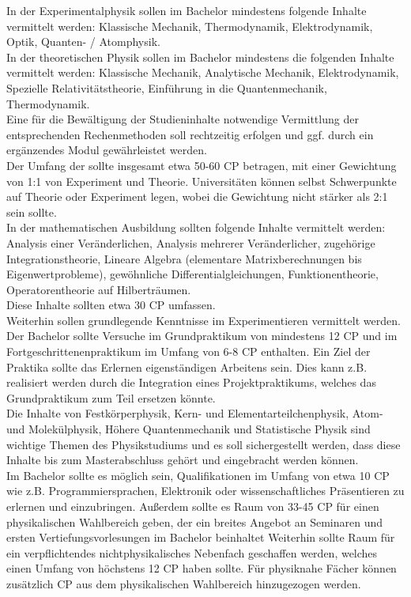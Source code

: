 \documentclass[a4paper]{scrartcl}
\begin{document}
\textcolor{Bernd}{\textbf{\cite{RESO: SoSe2010-BaMa}} In der Experimentalphysik sollen im Bachelor mindestens folgende Inhalte vermittelt werden: Klassische Mechanik, Thermodynamik, Elektrodynamik, Optik, Quanten- / Atomphysik.\\
In der theoretischen Physik sollen im Bachelor mindestens die folgenden Inhalte vermittelt werden: Klassische Mechanik, Analytische Mechanik, Elektrodynamik, Spezielle Relativitätstheorie, Einführung in die Quantenmechanik, Thermodynamik.\\
Eine für die Bewältigung der Studieninhalte notwendige Vermittlung der entsprechenden Rechenmethoden soll rechtzeitig erfolgen und ggf. durch ein ergänzendes Modul gewährleistet werden.\\
Der Umfang der sollte insgesamt etwa 50-60 CP betragen, mit einer Gewichtung von 1:1 von Experiment und Theorie. Universitäten können selbst Schwerpunkte auf Theorie oder Experiment legen, wobei die Gewichtung nicht stärker als 2:1 sein sollte.\\
In der mathematischen Ausbildung sollten folgende Inhalte vermittelt werden: Analysis einer Veränderlichen, Analysis mehrerer Veränderlicher, zugeh\"orige Integrationstheorie, Lineare Algebra (elementare Matrixberechnungen bis Eigenwertprobleme), gewöhnliche Differentialgleichungen, Funktionentheorie, Operatorentheorie auf Hilberträumen.\\
Diese Inhalte sollten etwa 30 CP umfassen.\\
Weiterhin sollen grundlegende Kenntnisse im Experimentieren vermittelt werden. Der Bachelor sollte Versuche im Grundpraktikum von mindestens 12 CP und im Fortgeschrittenenpraktikum im Umfang von 6-8 CP enthalten. Ein Ziel der Praktika sollte das Erlernen eigenständigen Arbeitens sein. Dies kann z.B. realisiert werden durch die Integration eines Projektpraktikums, welches das Grundpraktikum zum Teil ersetzen könnte.\\
Die Inhalte von Festkörperphysik, Kern- und Elementarteilchenphysik, Atom- und Molekülphysik, H\"ohere Quantenmechanik und Statistische Physik sind wichtige Themen des Physikstudiums und es soll sichergestellt werden, dass diese Inhalte bis zum Masterabschluss gehört und eingebracht werden können.\\
Im Bachelor sollte es möglich sein, Qualifikationen im Umfang von etwa 10 CP wie z.B. Programmiersprachen, Elektronik oder wissenschaftliches Präsentieren zu erlernen und einzubringen. Außerdem sollte es Raum von 33-45 CP für einen physikalischen Wahlbereich geben, der ein breites Angebot an Seminaren und ersten Vertiefungsvorlesungen im Bachelor beinhaltet Weiterhin sollte Raum für ein verpflichtendes nichtphysikalisches Nebenfach geschaffen werden, welches einen Umfang von h\"ochstens 12 CP haben sollte. Für physiknahe Fächer können zusätzlich CP aus dem physikalischen Wahlbereich hinzugezogen werden.
}\\
\end{document}
